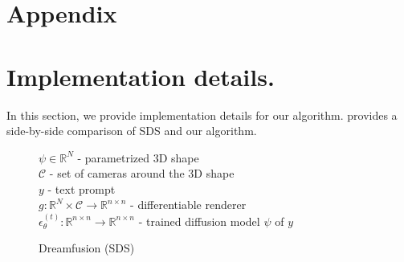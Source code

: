 \appendix
\section*{Appendix}


\section{Implementation details.}
\label{section:impl_details}

In this section, we provide implementation details for our algorithm.
 provides a side-by-side comparison of SDS and our algorithm. 

\begin{figure}[h!]
    \centering
    \begin{minipage}{.5\textwidth}
        \centering
        \begin{algorithm}[H]
            \caption{Dreamfusion (SDS)}\label{alg:original_dreamfusion}
            \begin{algorithmic}\footnotesize
                \Require
                    $\psi \in \mathbb{R}^N$ {- parametrized 3D shape} \\
                    $\mathcal{C}$ {- set of cameras around the 3D shape} \\
                    $y$ {- text prompt} \\
                    $g: \mathbb{R}^N \times \mathcal{C} \rightarrow \mathbb{R}^{n \times n}$ {- differentiable renderer} \\
                    $\epsilon_\theta^{(t)} : \mathbb{R}^{n \times n} \rightarrow \mathbb{R}^{n \times n}$ {- trained diffusion model}
                 $\psi$ {of} $y$


\end{algorithmic}
\end{algorithm}
\end{minipage}
\end{figure}
